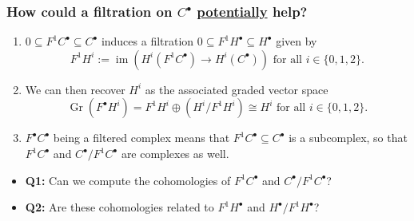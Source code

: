 \documentclass[notheorems, hyperref={backref}]{beamer}
\theoremstyle{darkgreentheorem}
\theoremstyle{darkbluedefinition}
\theoremstyle{darkredexample}
\theoremstyle{remark}
\DeclareMathOperator{\Gr}{Gr}
\DeclareMathOperator{\im}{im}
\newcommand{\op}{\oplus}
\begin{document}
\begin{frame}
    \frametitle{How could a filtration on $C^{\bullet}$ \underline{potentially} help?}
    \pause
    \begin{enumerate}
	\item $0\subseteq F^{1}C^{\bullet}\subseteq C^{\bullet}$ induces a filtration $0\subseteq F^{1}H^{\bullet}\subseteq H^{\bullet}$ given by
	    \[ F^{1}H^{i}:=\im\left(H^{i}(F^{1}C^{\bullet})\to H^{i}(C^{\bullet})\right) \text{ for all }i\in \{0,1,2\}. \]
	    \vspace{-5mm}
	    \pause
	\item We can then recover $H^{i}$ as the associated graded vector space
	    \[ \Gr(F^{\bullet}H^{i})=F^{1}H^{i}\op \left(H^{i}/F^{1}H^{i}\right)\cong H^{i} \text{ for all }i\in \{0,1,2\}. \]
	    \vspace{-5mm}
	    \pause
	\item $F^{\bullet}C^{\bullet}$ being a filtered complex means that $F^{1}C^{\bullet}\subseteq C^{\bullet}$ is a subcomplex, so that $F^{1}C^{\bullet}$ and $C^{\bullet}/F^{1}C^{\bullet}$ are complexes as well.
    \end{enumerate}
    \pause
    \vspace{5mm}
    \begin{itemize}
	\item \textbf{Q1:} Can we compute the cohomologies of $F^{1}C^{\bullet}$ and $C^{\bullet}/F^{1}C^{\bullet}$?
	    \vspace{2mm}
	    \pause
	\item \textbf{Q2:} Are these cohomologies related to $F^{1}H^{\bullet}$ and $H^{\bullet}/F^{1}H^{\bullet}$?
    \end{itemize}
\end{frame}
\end{document}
